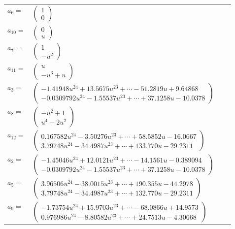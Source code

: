 \documentclass[1p]{elsarticle_modified}
\theoremstyle{definition}
\begin{document}
\begin{tabular}{m{7pt} m{180pt} m{7pt} m{180pt} }
\flushright $a_{6}=$&$\begin{pmatrix}1\\0\end{pmatrix}$ \\
\flushright $a_{10}=$&$\begin{pmatrix}0\\u\end{pmatrix}$ \\
\flushright $a_{7}=$&$\begin{pmatrix}1\\- u^2\end{pmatrix}$ \\
\flushright $a_{11}=$&$\begin{pmatrix}u\\- u^3+u\end{pmatrix}$ \\
\flushright $a_{3}=$&$\begin{pmatrix}-1.41948 u^{24}+13.5675 u^{23}+\cdots-51.2819 u+9.64868\\-0.0309792 u^{24}-1.55537 u^{23}+\cdots+37.1258 u-10.0378\end{pmatrix}$ \\
\flushright $a_{8}=$&$\begin{pmatrix}- u^2+1\\u^4-2 u^2\end{pmatrix}$ \\
\flushright $a_{12}=$&$\begin{pmatrix}0.167582 u^{24}-3.50276 u^{23}+\cdots+58.5852 u-16.0667\\3.79748 u^{24}-34.4987 u^{23}+\cdots+133.770 u-29.2311\end{pmatrix}$ \\
\flushright $a_{2}=$&$\begin{pmatrix}-1.45046 u^{24}+12.0121 u^{23}+\cdots-14.1561 u-0.389094\\-0.0309792 u^{24}-1.55537 u^{23}+\cdots+37.1258 u-10.0378\end{pmatrix}$ \\
\flushright $a_{5}=$&$\begin{pmatrix}3.96506 u^{24}-38.0015 u^{23}+\cdots+190.355 u-44.2978\\3.79748 u^{24}-34.4987 u^{23}+\cdots+132.770 u-29.2311\end{pmatrix}$ \\
\flushright $a_{9}=$&$\begin{pmatrix}-1.73754 u^{24}+15.9703 u^{23}+\cdots-68.0866 u+14.9573\\0.976986 u^{24}-8.80582 u^{23}+\cdots+24.7513 u-4.30668\end{pmatrix}$ \\

\end{tabular}
\end{document}
